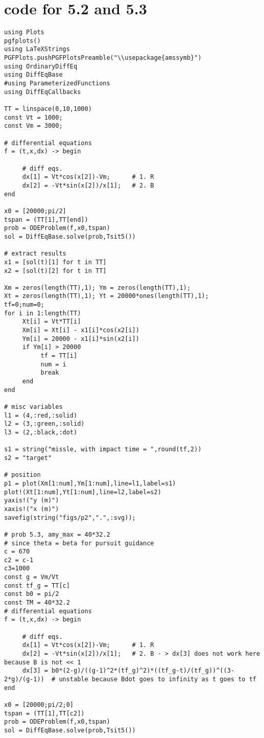 \documentclass[paper=a4, fontsize=11pt]{scrartcl}
\numberwithin{equation}{section}		%
\numberwithin{figure}{section}			%
\numberwithin{table}{section}				%
\begin{document}
\section*{code for 5.2 and 5.3}
\begin{lstlisting}
using Plots
pgfplots()
using LaTeXStrings
PGFPlots.pushPGFPlotsPreamble("\\usepackage{amssymb}")
using OrdinaryDiffEq
using DiffEqBase
#using ParameterizedFunctions
using DiffEqCallbacks

TT = linspace(0,10,1000)
const Vt = 1000;
const Vm = 3000;

# differential equations
f = (t,x,dx) -> begin

     # diff eqs.
     dx[1] = Vt*cos(x[2])-Vm;      # 1. R
     dx[2] = -Vt*sin(x[2])/x[1];   # 2. B
end

x0 = [20000;pi/2]
tspan = (TT[1],TT[end])
prob = ODEProblem(f,x0,tspan)
sol = DiffEqBase.solve(prob,Tsit5())

# extract results
x1 = [sol(t)[1] for t in TT]
x2 = [sol(t)[2] for t in TT]

Xm = zeros(length(TT),1); Ym = zeros(length(TT),1);
Xt = zeros(length(TT),1); Yt = 20000*ones(length(TT),1);
tf=0;num=0;
for i in 1:length(TT)
     Xt[i] = Vt*TT[i]
     Xm[i] = Xt[i] - x1[i]*cos(x2[i])
     Ym[i] = 20000 - x1[i]*sin(x2[i])
     if Ym[i] > 20000
          tf = TT[i]
          num = i
          break
     end
end

# misc variables
l1 = (4,:red,:solid)
l2 = (3,:green,:solid)
l3 = (2,:black,:dot)

s1 = string("missle, with impact time = ",round(tf,2))
s2 = "target"

# position
p1 = plot(Xm[1:num],Ym[1:num],line=l1,label=s1)
plot!(Xt[1:num],Yt[1:num],line=l2,label=s2)
yaxis!("y (m)")
xaxis!("x (m)")
savefig(string("figs/p2",".",:svg));

# prob 5.3, amy_max = 40*32.2
# since theta = beta for pursuit guidance
c = 670
c2 = c-1
c3=1000
const g = Vm/Vt
const tf_g = TT[c]
const b0 = pi/2
const TM = 40*32.2
# differential equations
f = (t,x,dx) -> begin

     # diff eqs.
     dx[1] = Vt*cos(x[2])-Vm;      # 1. R
     dx[2] = -Vt*sin(x[2])/x[1];   # 2. B - > dx[3] does not work here because B is not << 1
     dx[3] = b0*(2-g)/((g-1)^2*(tf_g)^2)*((tf_g-t)/(tf_g))^((3-2*g)/(g-1))  # unstable because Bdot goes to infinity as t goes to tf
end

x0 = [20000;pi/2;0]
tspan = (TT[1],TT[c2])
prob = ODEProblem(f,x0,tspan)
sol = DiffEqBase.solve(prob,Tsit5())


\end{lstlisting}
\end{document}
